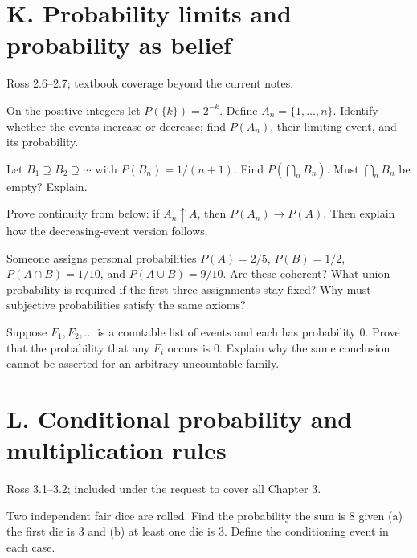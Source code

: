 \documentclass[11pt]{article}
\newcommand{\qid}[1]{\par\needspace{5\baselineskip}\noindent{\color{accent}\bfseries #1}\quad}
\newcommand{\source}[1]{{\small\color{muted}#1}\par}
\begin{document}
\clearpage
\section*{K. Probability limits and probability as belief}
\source{Ross 2.6--2.7; textbook coverage beyond the current notes.}
\qid{K1} On the positive integers let \(P(\{k\})=2^{-k}\). Define \(A_n=\{1,\ldots,n\}\). Identify whether the events increase or decrease; find \(P(A_n)\), their limiting event, and its probability.
\par\vspace{0.40in}

\qid{K2} Let \(B_1\supseteq B_2\supseteq\cdots\) with \(P(B_n)=1/(n+1)\). Find \(P(\bigcap_n B_n)\). Must \(\bigcap_n B_n\) be empty? Explain.
\par\vspace{0.40in}

\qid{K3} Prove continuity from below: if \(A_n\uparrow A\), then \(P(A_n)\to P(A)\). Then explain how the decreasing-event version follows.
\par\vspace{0.40in}

\qid{K4} Someone assigns personal probabilities \(P(A)=2/5\), \(P(B)=1/2\), \(P(A\cap B)=1/10\), and \(P(A\cup B)=9/10\). Are these coherent? What union probability is required if the first three assignments stay fixed? Why must subjective probabilities satisfy the same axioms?
\par\vspace{0.40in}

\qid{K5} Suppose \(F_1,F_2,\ldots\) is a countable list of events and each has probability 0. Prove that the probability that any \(F_i\) occurs is 0. Explain why the same conclusion cannot be asserted for an arbitrary uncountable family.
\par\vspace{0.40in}


\clearpage
\section*{L. Conditional probability and multiplication rules}
\source{Ross 3.1--3.2; included under the request to cover all Chapter 3.}
\qid{L1} Two independent fair dice are rolled. Find the probability the sum is 8 given (a) the first die is 3 and (b) at least one die is 3. Define the conditioning event in each case.
\par\vspace{0.40in}
\end{document}
